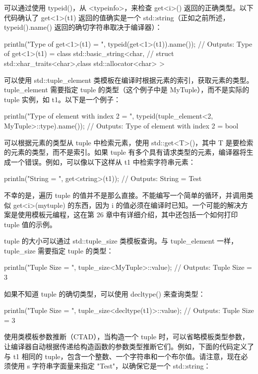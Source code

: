 可以通过使用 typeid()，从 <typeinfo>，来检查 get<i>() 返回的正确类型。以下代码确认了 get<1>(t1) 返回的值确实是一个 std::string（正如之前所述，typeid().name() 返回的确切字符串取决于编译器）：

\begin{cpp}
println("Type of get<1>(t1) = {}", typeid(get<1>(t1)).name());
// Outputs: Type of get<1>(t1) = class std::basic_string<char,
// struct std::char_traits<char>,class std::allocator<char> >
\end{cpp}

可以使用 std::tuple\_element 类模板在编译时根据元素的索引，获取元素的类型。tuple\_element 需要指定 tuple 的类型（这个例子中是 MyTuple），而不是实际的 tuple 实例，如 t1。以下是一个例子：

\begin{cpp}
println("Type of element with index 2 = {}",
    typeid(tuple_element<2, MyTuple>::type).name());
// Outputs: Type of element with index 2 = bool
\end{cpp}

可以根据元素的类型从 tuple 中检索元素，使用 std::get<T>()，其中 T 是要检索的元素的类型，而不是索引。如果 tuple 有多个具有请求类型的元素，编译器将生成一个错误。例如，可以像以下这样从 t1 中检索字符串元素：

\begin{cpp}
println("String = {}", get<string>(t1));
// Outputs: String = Test
\end{cpp}

不幸的是，遍历 tuple 的值并不是那么直接。不能编写一个简单的循环，并调用类似 get<i>(mytuple) 的东西，因为 i 的值必须在编译时已知。一个可能的解决方案是使用模板元编程，这在第 26 章中有详细介绍，其中还包括一个如何打印 tuple 值的示例。

tuple 的大小可以通过 std::tuple\_size 类模板查询。与 tuple\_element 一样，tuple\_size 需要指定 tuple 的类型：

\begin{cpp}
println("Tuple Size = {}", tuple_size<MyTuple>::value);
// Outputs: Tuple Size = 3
\end{cpp}

如果不知道 tuple 的确切类型，可以使用 decltype() 来查询类型：

\begin{cpp}
println("Tuple Size = {}", tuple_size<decltype(t1)>::value);
// Outputs: Tuple Size = 3
\end{cpp}

使用类模板参数推断（CTAD），当构造一个 tuple 时，可以省略模板类型参数，让编译器自动根据传递给构造函数的参数类型推断它们。例如，下面的代码定义了与 t1 相同的 tuple，包含一个整数、一个字符串和一个布尔值。请注意，现在必须使用 s 字符串字面量来指定 "Test"，以确保它是一个 std::string：

